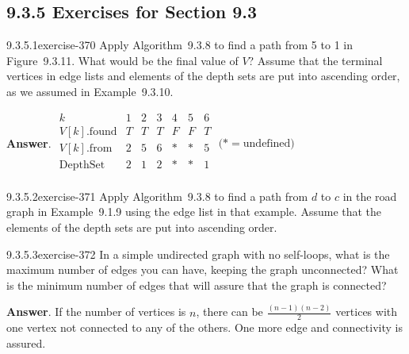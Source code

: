 \documentclass[twoside,10pt,]{book}
\numberwithin{equation}{section}
\begin{document}
\subsection*{9.3.5 Exercises for Section 9.3}
\begin{divisionsolution}{9.3.5.1}{}{exercise-370}%
\hypertarget{p-3216}{}%
Apply Algorithm~9.3.8 to find a path from 5 to 1 in Figure~9.3.11. What would be the final value of \(V\)? Assume that the terminal vertices in edge lists and elements of the depth sets are put into ascending order, as we assumed in Example~9.3.10.%
\par\smallskip%
\noindent\textbf{Answer}.\quad%
\hypertarget{p-3217}{}%
\(\begin{array}{ccccccc}
k & 1 & 2 & 3 & 4 & 5 & 6 \\
V[k].\text{found} & T & T & T & F & F & T \\
V[k].\text{from} & 2 & 5 & 6 & * & * & 5 \\
\text{Depth} \text{Set} & 2 & 1 & 2 & * & * & 1 \\
\end{array}\) \(\text{(*} = \text{undefined})\)%
\end{divisionsolution}%
\begin{divisionsolution}{9.3.5.2}{}{exercise-371}%
\hypertarget{p-3218}{}%
Apply Algorithm~9.3.8 to find a path from \(d\) to \(c\)  in the road graph in Example~9.1.9 using the edge list in that example. Assume that the elements of the depth sets are put into ascending order.%
\end{divisionsolution}%
\begin{divisionsolution}{9.3.5.3}{}{exercise-372}%
\hypertarget{p-3219}{}%
In a simple undirected graph with no self-loops, what is the maximum number of edges you can have, keeping the graph unconnected? What is the minimum number of edges that will assure that the graph is connected?%
\par\smallskip%
\noindent\textbf{Answer}.\quad%
\hypertarget{p-3220}{}%
If the number of vertices is \(n\), there can be \(\frac{(n-1)(n-2)}{2}\) vertices with one vertex not connected to any of the others. One more edge and connectivity is assured.%
\end{divisionsolution}%
\end{document}
